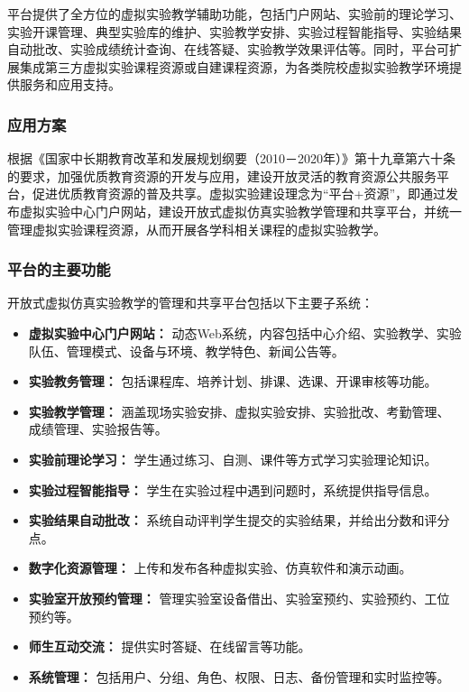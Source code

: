 平台提供了全方位的虚拟实验教学辅助功能，包括门户网站、实验前的理论学习、实验开课管理、典型实验库的维护、实验教学安排、实验过程智能指导、实验结果自动批改、实验成绩统计查询、在线答疑、实验教学效果评估等。同时，平台可扩展集成第三方虚拟实验课程资源或自建课程资源，为各类院校虚拟实验教学环境提供服务和应用支持。

\subsubsection{应用方案}
根据《国家中长期教育改革和发展规划纲要（2010－2020年）》第十九章第六十条的要求，加强优质教育资源的开发与应用，建设开放灵活的教育资源公共服务平台，促进优质教育资源的普及共享。虚拟实验建设理念为“平台+资源”，即通过发布虚拟实验中心门户网站，建设开放式虚拟仿真实验教学管理和共享平台，并统一管理虚拟实验课程资源，从而开展各学科相关课程的虚拟实验教学。

\subsubsection{平台的主要功能}
开放式虚拟仿真实验教学的管理和共享平台包括以下主要子系统：

\begin{itemize}
    \item \textbf{虚拟实验中心门户网站：} 动态Web系统，内容包括中心介绍、实验教学、实验队伍、管理模式、设备与环境、教学特色、新闻公告等。
    \item \textbf{实验教务管理：} 包括课程库、培养计划、排课、选课、开课审核等功能。
    \item \textbf{实验教学管理：} 涵盖现场实验安排、虚拟实验安排、实验批改、考勤管理、成绩管理、实验报告等。
    \item \textbf{实验前理论学习：} 学生通过练习、自测、课件等方式学习实验理论知识。
    \item \textbf{实验过程智能指导：} 学生在实验过程中遇到问题时，系统提供指导信息。
    \item \textbf{实验结果自动批改：} 系统自动评判学生提交的实验结果，并给出分数和评分点。
    \item \textbf{数字化资源管理：} 上传和发布各种虚拟实验、仿真软件和演示动画。
    \item \textbf{实验室开放预约管理：} 管理实验室设备借出、实验室预约、实验预约、工位预约等。
    \item \textbf{师生互动交流：} 提供实时答疑、在线留言等功能。
    \item \textbf{系统管理：} 包括用户、分组、角色、权限、日志、备份管理和实时监控等。
\end{itemize}

